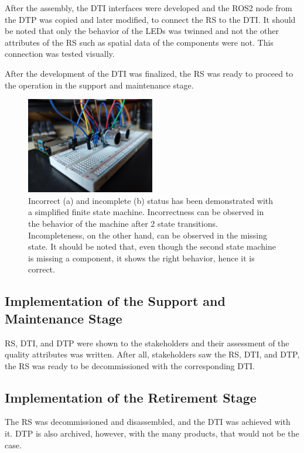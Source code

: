 \documentclass[conference]{IEEEtran}
\begin{document}
    After the assembly, the DTI interfaces were developed and the ROS2 node from the DTP was copied and later modified, to connect the RS to the DTI. It should be noted that only the behavior of the LEDs was twinned and not the other attributes of the RS such as spatial data of the components were not. This connection was tested visually. 

    After the development of the DTI was finalized, the RS was ready to proceed to the operation in the support and maintenance stage.

    \begin{figure}[htbp]
        \centering
        \includegraphics[width=0.5\textwidth]{Assembled.jpg}
        \caption{Incorrect (a) and incomplete (b) status has been demonstrated with a simplified finite state machine. Incorrectness can be observed in the behavior 
        of the machine after 2 state transitions. Incompleteness, on the other hand, can be observed in the missing state. It should be noted that, even though the second state machine is missing a 
        component, it shows the right behavior, hence it is correct.}\label{fig:Assembled}
    \end{figure}

    \subsection{Implementation of the Support and Maintenance Stage}
    RS, DTI, and DTP were shown to the stakeholders and their assessment of the quality attributes was written. After all, stakeholders saw the RS, DTI, and DTP, the RS was ready to be decommissioned with the corresponding DTI.
    
    \subsection{Implementation of the Retirement Stage}
    The RS was decommissioned and disassembled, and the DTI was achieved with it. DTP is also archived, however, with the many products, that would not be the case.
\end{document}
